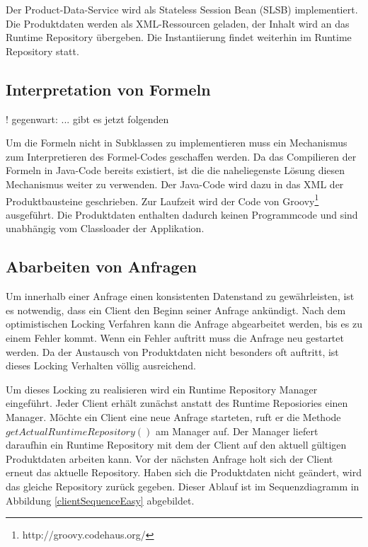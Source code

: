 \documentclass[headsepline=true, footsepline=true]{scrartcl}
\begin{document}
Der Product-Data-Service wird als Stateless Session Bean (SLSB) implementiert.
Die Produktdaten werden als XML-Ressourcen geladen, der Inhalt wird an das
Runtime Repository übergeben. Die Instantiierung findet weiterhin im Runtime
Repository statt.

\subsection{Interpretation von Formeln}

! gegenwart: ... gibt es jetzt folgenden

Um die Formeln nicht in Subklassen zu implementieren muss ein Mechanismus zum
Interpretieren des Formel-Codes geschaffen werden. Da das Compilieren der Formeln
in Java-Code bereits existiert, ist die die naheliegenste Lösung diesen
Mechanismus weiter zu verwenden. Der Java-Code wird dazu in das XML der
Produktbausteine geschrieben. Zur Laufzeit wird der Code von
Groovy\footnote{http://groovy.codehaus.org/} ausgeführt. Die Produktdaten
enthalten dadurch keinen Programmcode und sind unabhängig vom Classloader der
Applikation.

\subsection{Abarbeiten von Anfragen}

Um innerhalb einer Anfrage einen konsistenten Datenstand zu gewährleisten, ist es
notwendig, dass ein Client den Beginn seiner Anfrage ankündigt. Nach dem
optimistischen Locking Verfahren kann die Anfrage abgearbeitet werden, bis es zu
einem Fehler kommt. Wenn ein Fehler auftritt muss die Anfrage neu gestartet
werden. Da der Austausch von Produktdaten nicht besonders oft auftritt, ist
dieses Locking Verhalten völlig ausreichend.

Um dieses Locking zu realisieren wird ein Runtime Repository Manager eingeführt.
Jeder Client erhält zunächst anstatt des Runtime Reposiories einen Manager.
Möchte ein Client eine neue Anfrage starteten, ruft er die Methode
$getActualRuntimeRepository()$ am Manager auf. Der Manager liefert daraufhin ein
Runtime Repository mit dem der Client auf den aktuell gültigen Produktdaten
arbeiten kann. Vor der nächsten Anfrage holt sich der Client erneut das aktuelle
Repository. Haben sich die Produktdaten nicht geändert, wird das gleiche
Repository zurück gegeben. Dieser Ablauf ist im Sequenzdiagramm in
Abbildung \ref{clientSequenceEasy} abgebildet.
\end{document}
